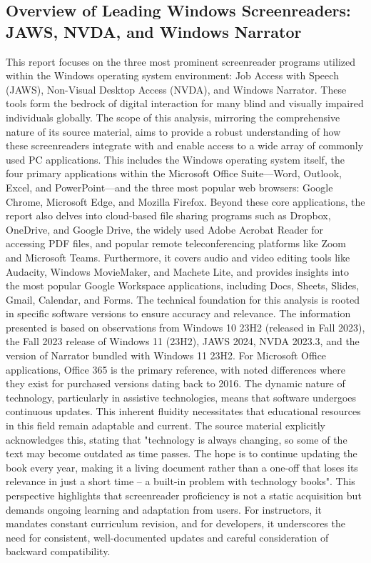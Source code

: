 \subsection{Overview of Leading Windows Screenreaders: JAWS, NVDA, and Windows Narrator}
This report focuses on the three most prominent screenreader programs utilized within the Windows operating system environment: Job Access with Speech (JAWS), Non-Visual Desktop Access (NVDA), and Windows Narrator.\supercite{kingsbury2025} These tools form the bedrock of digital interaction for many blind and visually impaired individuals globally.
The scope of this analysis, mirroring the comprehensive nature of its source material, aims to provide a robust understanding of how these screenreaders integrate with and enable access to a wide array of commonly used PC applications. This includes the Windows operating system itself, the four primary applications within the Microsoft Office Suite—Word, Outlook, Excel, and PowerPoint—and the three most popular web browsers: Google Chrome, Microsoft Edge, and Mozilla Firefox.\supercite{kingsbury2025} Beyond these core applications, the report also delves into cloud-based file sharing programs such as Dropbox, OneDrive, and Google Drive, the widely used Adobe Acrobat Reader for accessing PDF files, and popular remote teleconferencing platforms like Zoom and Microsoft Teams.\supercite{kingsbury2025} Furthermore, it covers audio and video editing tools like Audacity, Windows MovieMaker, and Machete Lite, and provides insights into the most popular Google Workspace applications, including Docs, Sheets, Slides, Gmail, Calendar, and Forms.\supercite{kingsbury2025}
The technical foundation for this analysis is rooted in specific software versions to ensure accuracy and relevance. The information presented is based on observations from Windows 10 23H2 (released in Fall 2023), the Fall 2023 release of Windows 11 (23H2), JAWS 2024, NVDA 2023.3, and the version of Narrator bundled with Windows 11 23H2. For Microsoft Office applications, Office 365 is the primary reference, with noted differences where they exist for purchased versions dating back to 2016.\supercite{kingsbury2025} The dynamic nature of technology, particularly in assistive technologies, means that software undergoes continuous updates. This inherent fluidity necessitates that educational resources in this field remain adaptable and current. The source material explicitly acknowledges this, stating that "technology is always changing, so some of the text may become outdated as time passes. The hope is to continue updating the book every year, making it a living document rather than a one-off that loses its relevance in just a short time – a built-in problem with technology books".\supercite{kingsbury2025} This perspective highlights that screenreader proficiency is not a static acquisition but demands ongoing learning and adaptation from users. For instructors, it mandates constant curriculum revision, and for developers, it underscores the need for consistent, well-documented updates and careful consideration of backward compatibility.


